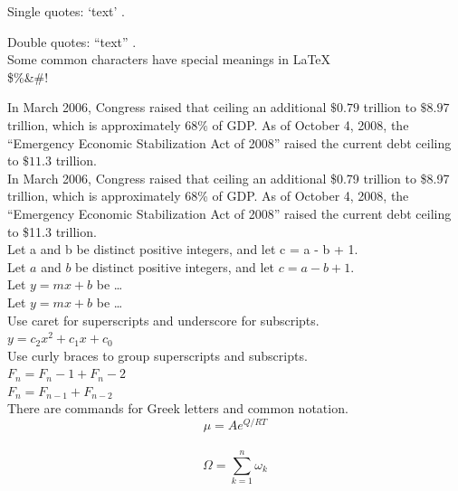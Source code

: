 \documentclass[12pt,a4paper]{article}
\begin{document}
Single quotes: `text' . 

Double quotes: ``text'' . \\ [6pt]


Some common characters have special meanings in \LaTeX\: \\
\$\%\&\#!


In March 2006, Congress raised that ceiling an additional $\$0.79$
trillion to $ \$8.97$ trillion, which is approximately $68\%$ of GDP.  As of
October 4, 2008, the ``Emergency Economic Stabilization Act of
2008'' raised the current debt ceiling to $\$11.3$ trillion. \\[6pt]

In March 2006, Congress raised that ceiling an additional \$0.79 trillion to \$8.97 trillion, which is approximately 68\% of GDP. As of October 4, 2008, the ``Emergency Economic Stabilization Act of 2008'' raised the current debt ceiling to \$11.3 trillion.\\[6pt]


Let a and b be distinct positive
integers, and let c = a - b + 1. \\[6pt]

Let $a$ and $b$ be distinct positive
integers, and let $c = a - b + 1$. \\[6pt]

Let $y=mx+b$ be \ldots\\[6pt]

Let $y = m x + b$ be \ldots\\[6pt]

 Use caret  for superscripts and underscore  for subscripts.\\[6pt]
$y = c_2 x^2 + c_1 x + c_0$ \\[6pt]

 Use curly braces to group superscripts and subscripts.\\[6pt]
$F_n = F_n-1 + F_n-2$ \\[6pt] %
$F_n = F_{n-1} + F_{n-2}$ \\[6pt] %

There are commands for Greek letters and common notation. \\[6pt]
$$\mu = A e^{Q/RT}$$\\[6pt]
$$\Omega = \sum_{k=1}^{n} \omega_k$$\\[6pt]

\end{document}
